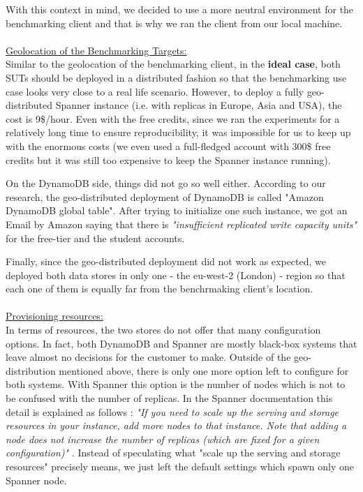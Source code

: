 \documentclass[letterpaper, 10 pt, conference]{ieeeconf}  %
\begin{document}
With this context in mind, we decided to use a more neutral environment for the benchmarking client and that is why we ran the client from our local machine.
\\
\\
\underline{Geolocation of the Benchmarking Targets:}
\\
Similar to the geolocation of the benchmarking client, in the \textbf{ideal case}, both SUTs should be deployed in a distributed fashion so that the benchmarking use case looks very close to a real life scenario. However, to deploy a fully geo-distributed Spanner instance (i.e. with replicas in Europe, Asia and USA), the cost is 9\$/hour. Even with the free credits, since we ran the experiments for a relatively long time to ensure reproducibility, it was impossible for us to keep up with the enormous costs (we even used a full-fledged account with 300\$ free credits but it was still too expensive to keep the Spanner instance running). \par
On the DynamoDB side, things did not go so well either. According to our research, the geo-distributed deployment of DynamoDB is called "Amazon DynamoDB global table". After trying to initialize one such instance, we got an Email by Amazon saying that there is \textit{"insufficient replicated write capacity units"} for the free-tier and the student accounts. \par 
Finally, since the geo-distributed deployment did not work as expected, we deployed both data stores in only one -  the eu-west-2 (London) - region so that each one of them is equally far from the benchrmaking client's location.
\\
\\
\underline{Provisioning resources:}
\\
In terms of resources, the two stores do not offer that many configuration options. In fact, both DynamoDB and Spanner are mostly black-box systems that leave almost no decisions for the customer to make. Outside of the geo-distribution mentioned above, there is only one more option left to configure for both systems. With Spanner this option is the number of nodes which is not to be confused with the number of replicas. In the Spanner documentation this detail is explained as follows : \textit{"If you need to scale up the serving and storage resources in your instance, add more nodes to that instance. Note that adding a node does not increase the number of replicas (which are fixed for a given configuration)"} \cite{SpannerInstances}. Instead of speculating what "scale up the serving and storage resources" precisely means, we just left the default settings which spawn only one Spanner node. \par 
\end{document}
